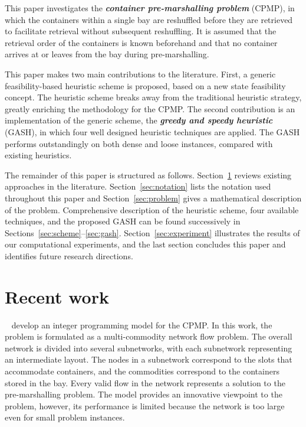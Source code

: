 \documentclass[review,3p,times,12pt,number]{elsarticle}\usepackage{amsmath}\usepackage{amssymb}
\renewcommand{\citet}[1]{\citeauthor{#1}~\citep{#1}}
\renewcommand{\emph}[1]{\textbf{\textit{#1}}}
\begin{document}
This paper investigates the \emph{container pre-marshalling problem} (CPMP), in which the containers within a single bay are reshuffled before they are retrieved to facilitate retrieval without subsequent reshuffling. It is assumed that the retrieval order of the containers is known beforehand and that no container arrives at or leaves from the bay during pre-marshalling. 

This paper makes two main contributions to the literature. First, a generic feasibility-based heuristic scheme is proposed, based on a new state feasibility concept. The heuristic scheme breaks away from the traditional heuristic strategy, greatly enriching the methodology for the CPMP\@. The second contribution is an implementation of the generic scheme, the \emph{greedy and speedy heuristic} (GASH), in which four well designed heuristic techniques are applied. The GASH performs outstandingly on both dense and loose instances, compared with existing heuristics.

The remainder of this paper is structured as follows. Section~\ref{sec:literature} reviews existing approaches in the literature. Section~\ref{sec:notation} lists the notation used throughout this paper and Section~\ref{sec:problem} gives a mathematical description of the problem. Comprehensive description of the heuristic scheme, four available techniques, and the proposed GASH can be found successively in Sections~\ref{sec:scheme}--\ref{sec:gash}. Section~\ref{sec:experiment} illustrates the results of our computational experiments, and the last section concludes this paper and identifies future research directions.

\section{Recent work}
\label{sec:literature}


\citet{lee2007} develop an integer programming model for the CPMP\@. In this work, the problem is formulated as a multi-commodity network flow problem. The overall network is divided into several subnetworks, with each subnetwork representing an intermediate layout. The nodes in a subnetwork correspond to the slots that accommodate containers, and the commodities correspond to the containers stored in the bay. Every valid flow in the network represents a solution to the pre-marshalling problem. The model provides an innovative viewpoint to the problem, however, its performance is limited because the network is too large even for small problem instances.
\end{document}
